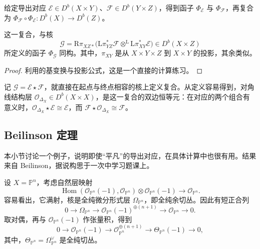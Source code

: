 给定导出对应 $\mathcal{E}\in D^b(X\times Y)$、$\mathcal{F}\in D^b(Y\times Z)$，得到函子 $\Phi_{\mathcal{E}}$ 与 $\Phi_{\mathcal{F}}$，再复合为 $\Phi_{\mathcal{F}}\circ\Phi_{\mathcal{E}}\colon D^b(X)\to D^b(Z)$。
\begin{proposition}\label{prop:4.70}
这一复合，与核
\[
\mathcal{G}=\mathrm{R}\pi_{XZ*}
\bigl(\mathrm{L}\pi_{YZ}^*\mathcal{F}\otimes^{\mathrm{L}}
\mathrm{L}\pi_{XY}^*\mathcal{E}\bigr)
\in D^b(X\times Z)
\]
所定义的函子 $\Phi_{\mathcal{G}}$ 同构。其中，$\pi_{XY}$ 是从 $X\times Y\times Z$ 到 $X\times Y$ 的投影，其余类似。
\end{proposition}
\begin{proof}
利用的基变换与投影公式，这是一个直接的计算练习。\BookQED
\end{proof}

记 $\mathcal{G}=\mathcal{E}\star\mathcal{F}$，就直接在起点与终点相容的核上定义复合。从定义容易得到，对角线结构层 $\mathcal{O}_{\Delta_X}\in D^b(X\times X)$，是这一复合的双边恒等元：在对应的两个组合有意义时，$\mathcal{O}_{\Delta_X}\star\mathcal{E}\cong\mathcal{E}$，而 $\mathcal{F}\star\mathcal{O}_{\Delta_X}\cong\mathcal{F}$。

\subsection{Beilinson 定理}\label{sec:4.6.2}

本小节讨论一个例子，说明即使“平凡”的导出对应，在具体计算中也很有用。结果来自 Beilinson，据说构思于一次中学习题课上。

设 $X=\mathbb{P}^n$，考虑自然层映射
\[
\operatorname{Hom}(\mathcal{O}_{\mathbb{P}^n}(-1),\mathcal{O}_{\mathbb{P}^n})
\otimes\mathcal{O}_{\mathbb{P}^n}(-1)\longrightarrow\mathcal{O}_{\mathbb{P}^n}.
\]
容易看出，它满射，核是全纯微分形式层 $\Omega_{\mathbb{P}^n}$，即全纯余切丛。因此有短正合列
\[
0\longrightarrow\Omega_{\mathbb{P}^n}
\longrightarrow\mathcal{O}_{\mathbb{P}^n}(-1)^{\oplus(n+1)}
\longrightarrow\mathcal{O}_{\mathbb{P}^n}\longrightarrow0.
\]
取对偶，再与 $\mathcal{O}_{\mathbb{P}^n}(-1)$ 作张量积，得到
\[
0\longrightarrow\mathcal{O}_{\mathbb{P}^n}(-1)
\longrightarrow\mathcal{O}_{\mathbb{P}^n}^{\oplus(n+1)}
\longrightarrow\Theta_{\mathbb{P}^n}(-1)\longrightarrow0,
\]
其中，$\Theta_{\mathbb{P}^n}=\Omega_{\mathbb{P}^n}^{\vee}$ 是全纯切丛。


